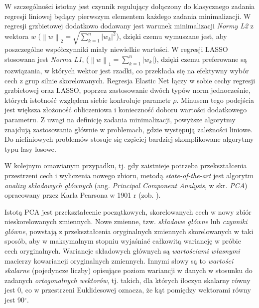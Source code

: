 W szczególności istotny jest czynnik regulujący dołączony do klasycznego zadania regresji liniowej będący pierwszym elementem każdego zadania minimalizacji. W regresji grzbietowej dodatkowo dodawany jest warunek minimalizacji \textit{Normy L2} z wektora $w$ ($\left \| w \right \|_2 =\sqrt{ \sum_{k=1}^{n}\left |w_k  \right |^2}$), dzięki czemu wymuszane jest, aby poszczególne współczynniki miały niewielkie wartości. W regresji LASSO stosowana jest \textit{Norma L1}, ($\left \| w \right \|_1 = \sum_{k=1}^{n}\left |w_k  \right |$), dzięki czemu preferowane są rozwiązania, w których wektor jest rzadki, co przekłada się na efektywny wybór cech z grup silnie skorelowanych. Regresja Elastic Net łączy w sobie cechy regresji grzbietowej oraz LASSO, poprzez zastosowanie dwóch typów norm jednocześnie, których istotność względem siebie kontroluje parametr $\rho$. Minusem tego podejścia jest większa złożoność obliczeniowa i konieczność doboru wartości dodatkowego parametru. Z uwagi na definicję zadania minimalizacji, powyższe algorytmy znajdują zastosowania głównie w problemach, gdzie występują zależności liniowe. Do nieliniowych problemów stosuje się częściej bardziej skomplikowane algorytmy typu lasy losowe.

W kolejnym omawianym przypadku, tj. gdy zaistnieje potrzeba przekształcenia przestrzeni cech i wyliczenia nowego zbioru, metodą \textit{state-of-the-art} jest algorytm \textit{analizy składowych głównych} (ang. \textit{Principal Component Analysis}, w skr. \textit{PCA}) opracowany przez Karla Pearsona w 1901 r (zob. \cite{PCA}).  

Istotą PCA jest przekształcenie początkowych, skorelowanych cech w nowy zbiór nieskorelowanych zmiennych. Nowe zmienne, tzw. \textit{składowe główne} lub \textit{czynniki główne}, powstają z przekształcenia oryginalnych zmiennych skorelowanych w taki sposób, aby w maksymalnym stopniu wyjaśniać całkowitą wariancję w próbie cech oryginalnych. Wariancje składowych głównych są \textit{wartościami własnymi} macierzy kowariancji oryginalnych zmiennych. Innymi słowy są to \textit{wartości skalarne} (pojedyncze liczby) opisujące poziom wariancji w danych w stosunku do zadanych \textit{ortogonalnych wektorów}, tj. takich, dla których iloczyn skalarny równy jest 0, co w przestrzeni Euklidesowej oznacza, że kąt pomiędzy wektorami równy jest 90$^\circ$.

